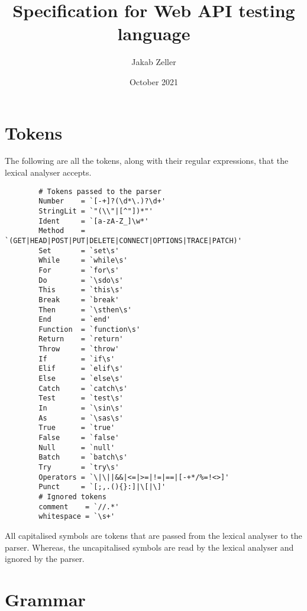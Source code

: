 \documentclass[12pt, letterpaper]{article}
\title{Specification for Web API testing language}
\author{Jakab Zeller}
\date{October 2021}
\begin{document}
\maketitle

\section{Tokens}

The following are all the tokens, along with their regular expressions, that the lexical analyser accepts.

\begin{center}
    \begin{verbatim}
        # Tokens passed to the parser
        Number    = `[-+]?(\d*\.)?\d+'
        StringLit = `"(\\"|[^"])*"'
        Ident     = `[a-zA-Z_]\w*'
        Method    = `(GET|HEAD|POST|PUT|DELETE|CONNECT|OPTIONS|TRACE|PATCH)'
        Set       = `set\s'
        While     = `while\s'
        For       = `for\s'
        Do        = `\sdo\s'
        This      = `this\s'
        Break     = `break'
        Then      = `\sthen\s'
        End       = `end'
        Function  = `function\s'
        Return    = `return'
        Throw     = `throw'
        If        = `if\s'
        Elif      = `elif\s'
        Else      = `else\s'
        Catch     = `catch\s'
        Test      = `test\s'
        In        = `\sin\s'
        As        = `\sas\s'
        True      = `true'
        False     = `false'
        Null      = `null'
        Batch     = `batch\s'
        Try       = `try\s'
        Operators = `\|\||&&|<=|>=|!=|==|[-+*/%=!<>]'
        Punct     = `[;,.(){}:]|\[|\]'
        # Ignored tokens
        comment    = `//.*'
        whitespace = `\s+'
    \end{verbatim}
\end{center}

All capitalised symbols are tokens that are passed from the lexical analyser to the parser. Whereas, the uncapitalised symbols are read by the lexical analyser and ignored by the parser.

\section{Grammar}
\end{document}
